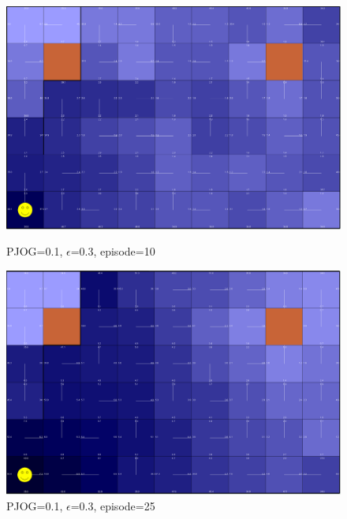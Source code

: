 \documentclass[11pt]{article}
\begin{document}
\begin{figure}[!htb]
   \begin{minipage}{0.34\textwidth}
     \centering
     \includegraphics[width=1.2\linewidth]{../figures/q1_3_10.png}
     \caption{PJOG=0.1, $\epsilon$=0.3, episode=10}\label{Fig:q1_3_10}
   \end{minipage}\hfill
   \begin{minipage}{0.34\textwidth}
     \centering
     \includegraphics[width=1.2\linewidth]{../figures/q1_3_25.png}
     \caption{PJOG=0.1, $\epsilon$=0.3, episode=25}\label{Fig:q1_3_25}
   \end{minipage}
\end{figure}
\end{document}
